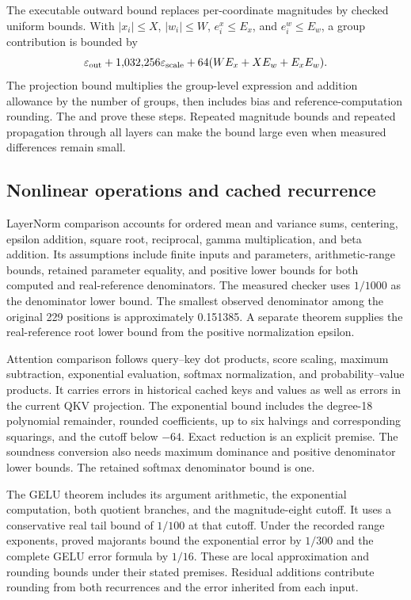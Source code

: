 The executable outward bound replaces per-coordinate magnitudes by checked uniform bounds.  With $|x_i|\leq X$, $|w_i|\leq W$, $e^x_i\leq E_x$, and $e^w_i\leq E_w$, a group contribution is bounded by
\begin{equation}
 \varepsilon_{\rm out}+1{,}032{,}256\varepsilon_{\rm scale}
 +64(WE_x+XE_w+E_xE_w).
 \label{eq:groupupper}
\end{equation}
The projection bound multiplies the group-level expression and addition allowance by the number of groups, then includes bias and reference-computation rounding.  The  and  prove these steps.  Repeated magnitude bounds and repeated propagation through all layers can make the bound large even when measured differences remain small.

\subsection{Nonlinear operations and cached recurrence}

LayerNorm comparison accounts for ordered mean and variance sums, centering, epsilon addition, square root, reciprocal, gamma multiplication, and beta addition.  Its assumptions include finite inputs and parameters, arithmetic-range bounds, retained parameter equality, and positive lower bounds for both computed and real-reference denominators.  The measured checker uses $1/1000$ as the denominator lower bound.  The smallest observed denominator among the original 229 positions is approximately 0.151385.  A separate theorem supplies the real-reference root lower bound from the positive normalization epsilon.

Attention comparison follows query--key dot products, score scaling, maximum subtraction, exponential evaluation, softmax normalization, and probability--value products.  It carries errors in historical cached keys and values as well as errors in the current QKV projection.  The exponential bound includes the degree-18 polynomial remainder, rounded coefficients, up to six halvings and corresponding squarings, and the cutoff below $-64$.  Exact reduction is an explicit premise.  The soundness conversion also needs maximum dominance and positive denominator lower bounds.  The retained softmax denominator bound is one.

The GELU theorem includes its argument arithmetic, the exponential computation, both quotient branches, and the magnitude-eight cutoff.  It uses a conservative real tail bound of $1/100$ at that cutoff.  Under the recorded range exponents, proved majorants bound the exponential error by $1/300$ and the complete GELU error formula by $1/16$.  These are local approximation and rounding bounds under their stated premises.  Residual additions contribute rounding from both recurrences and the error inherited from each input.

